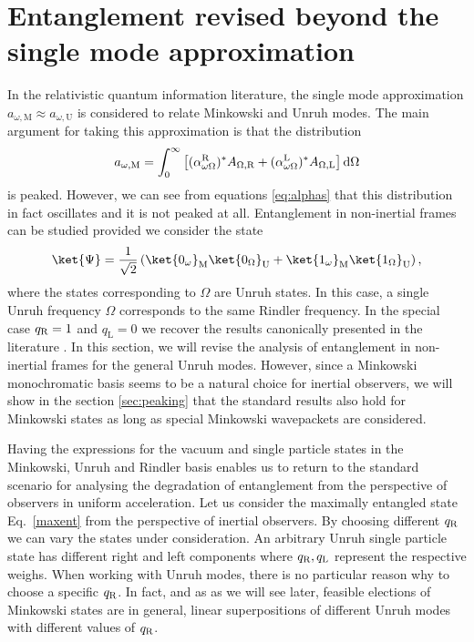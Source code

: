 \section{Entanglement revised beyond the single mode approximation\label{sec:entganglementrev}}

In the relativistic quantum information literature, the single mode approximation $a_{\omega,\text{M}}\approx a_{\omega,\text{U}}$ is considered to relate Minkowski and Unruh modes. The main argument for taking this approximation is that the distribution
\begin{equation}
\label{eq:Aa-transform}
a_{\omega,\text{M}} = \int_0^{\infty}\left[
(\alpha^\text{\text{R}}_{\omega\Omega})^{\ast} A_{\Omega,\text{\text{R}}}+(\alpha^\text{\text{L}}_{\omega\Omega})^{\ast} A_{\Omega,\text{\text{L}}}\right]\text{d}\Omega
\end{equation}
is peaked. However,  we can see from equations \eqref{eq:alphas}  that this distribution in fact oscillates and it is not peaked at all.  Entanglement in non-inertial frames can be studied provided we consider the state
\begin{equation}\label{maxent}
\ket{\Psi}=\frac{1}{\sqrt2}\left(\ket{0_\omega}_{\text M}\ket{0_\Omega}_\text{U}+\ket{1_\omega}_{\text{M}}\ket{1_\Omega}_\text{U}\right),
\end{equation}
where the states corresponding to $\Omega$ are Unruh states. In this case, a single Unruh frequency $\Omega$ corresponds to the same Rindler frequency. In the special case  $q_\text{\text{R}}=1$ and  $q_{\text{L}}=0$ we recover the results canonically presented in the literature \cite{Alicefalls,AlsingSchul,Edu4}. In this section, we will revise the analysis of entanglement in non-inertial frames for the general Unruh modes. However, since a Minkowski monochromatic basis seems to be a natural choice for inertial observers, we will show in the section \ref{sec:peaking} that the standard results also hold for Minkowski states as long as special Minkowski wavepackets are considered. 

Having the expressions for the vacuum and single particle states in the Minkowski, Unruh and Rindler basis enables us to return to the standard scenario for analysing the degradation of entanglement from the perspective of observers in uniform acceleration. Let us consider the maximally entangled state Eq.~\eqref{maxent} from the perspective of inertial observers. By choosing different  $q_\text{\text{R}}$ we can vary the states under consideration. An arbitrary Unruh single particle state has different right and left components where $q_\text{\text{R}}, q_\text{\text{L}}$ represent the respective weighs. When working with Unruh modes, there is no particular reason why to choose a specific $q_\text{\text{R}}$. In fact, and as as we will see later, feasible elections of Minkowski states are in general, linear superpositions of different Unruh modes  with different values of $q_\text{\text{R}}$.

